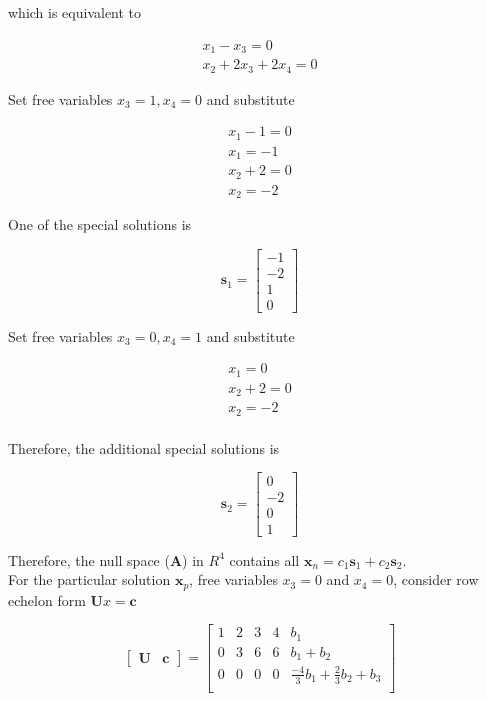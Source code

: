 \documentclass[main.tex]{subfiles}
\begin{document}
\begin{enumerate}
\begin{enumerate}
    which is equivalent to 

    $$
    \begin{array}{r}
    x_1 - x_3 = 0 \\
    x_2 + 2x_3 + 2x_4 = 0
    \end{array}
    $$

    Set free variables $x_3=1, x_4=0$ and substitute

    $$
    \begin{array}{r}
    x_1 - 1 = 0 \\
    x_1 = -1 \\
    x_2 + 2 = 0 \\
    x_2 = -2
    \end{array}
    $$

    One of the special solutions is
    
    $$\textbf{s}_1=\left[\begin{array}{c}-1 \\ -2 \\ 1 \\ 0\end{array}\right]$$

    Set free variables $x_3=0, x_4=1$ and substitute

    $$
    \begin{array}{r}
    x_1 = 0 \\
    x_2 + 2 = 0 \\
    x_2 = -2 \\
    \end{array}
    $$

    Therefore, the additional special solutions is 
    
    $$\textbf{s}_2=\left[\begin{array}{c}0 \\ -2 \\ 0 \\ 1\end{array}\right]$$
    
    Therefore, the null space  (\textbf{A}) in $R^4$ contains all $\textbf{x}_n=c_1 \textbf{s}_1+c_2 \textbf{s}_2$.\\ 
    
    For the particular solution $\textbf{x}_p$, free variables $x_3=0$ and $x_4=0$, consider row echelon form $\textbf{U} x=\textbf{c}$

    $$
    \left[\begin{array}{ll} \textbf{U} & \textbf{c} \end{array}\right] =
    \begin{bmatrix} 
    1 & 2 & 3 & 4 & b_1\\
    0 & 3 & 6 & 6 & b_1 + b_2 \\
    0 & 0 & 0 & 0 & \frac{-4}{3}b_1 + \frac{2}{3}b_2 + b_3 \\
    \end{bmatrix}
    $$


\end{enumerate}
\end{enumerate}
\end{document}
